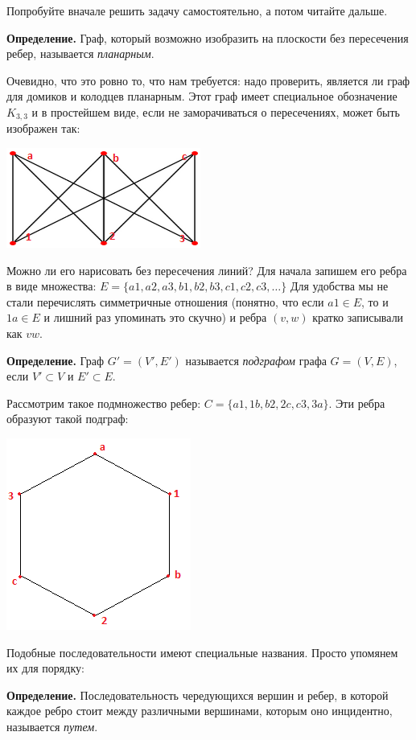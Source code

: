 Попробуйте вначале решить задачу самостоятельно, а потом читайте дальше.

{\bfseries Определение.} Граф, который возможно изобразить на плоскости без пересечения ребер, называется {\slshape планарным}.

Очевидно, что это ровно то, что нам требуется: надо проверить, является ли граф для домиков и колодцев планарным. Этот граф имеет специальное обозначение $K_{3, 3}$ и в простейшем виде, если не заморачиваться о пересечениях, может быть изображен так:

\includegraphics{k331.png}

Можно ли его нарисовать без пересечения линий? Для начала запишем его ребра в виде множества: $E = \{a1, a2, a3, b1, b2, b3, c1, c2, c3, \ldots\}$ Для удобства мы не стали перечислять симметричные отношения (понятно, что если $a1\in E$, то и $1a \in E$ и лишний раз упоминать это скучно) и ребра $(v, w)$ кратко записывали как $vw$.

{\bfseries Определение.} Граф $G' = (V', E')$ называется {\slshape подграфом} графа $G = (V, E)$, если $V' \subset V$ и $E' \subset E$.

Рассмотрим такое подмножество ребер: $C = \{a1, 1b, b2, 2c, c3, 3a\}$. Эти ребра образуют такой подграф:

\includegraphics{cycle.png}

Подобные последовательности имеют специальные названия. Просто упомянем их для порядку:

{\bfseries Определение.} Последовательность чередующихся вершин и ребер, в которой каждое ребро стоит между различными вершинами, которым оно инцидентно, называется {\slshape путем}.


